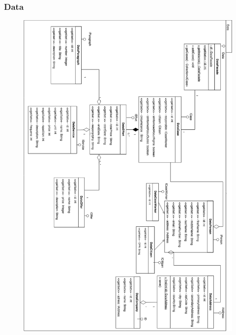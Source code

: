\documentclass[../main.tex]{subfiles}
\begin{document}
  \subsubsection{Data}
  \begin{figure}[H]
    \centering
    \includegraphics[scale=.4]{figurer/design-data.png}
    \label{fig:design_data}
  \end{figure}
  
  
 
\end{document}
